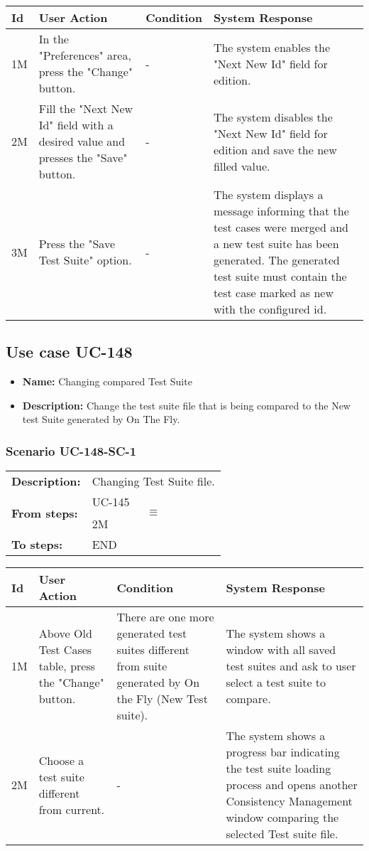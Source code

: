 \documentclass[a4paper,11pt]{article}
\newcommand{\bl}{\\ \hline}
\begin{document}
\begin{tabular}{|p{0.8in}|p{1.6in}|p{1.6in}|p{1.6in}|}
\hline
Id & User Action & Condition & System Response  \bl 
1M & In the "Preferences" area, press the "Change" button. & - & The system enables the "Next New Id" field for edition. \bl 
2M & Fill the "Next New Id" field with a desired value and presses the "Save" button. & - & The system disables the "Next New Id" field for edition and save the new filled value. \bl 
3M & Press the "Save Test Suite" option. & - & The system displays a message informing that the test cases were merged and a new test suite has been generated. The generated test suite must contain the test case marked as new with the configured id. \bl 
\end{tabular}
\subsection*{Use case UC-148}
\begin{itemize}
\item {\bf Name: }Changing compared Test Suite
\item {\bf Description: }Change the test suite file that is being compared to the New test Suite generated by On The Fly.
\end{itemize}
\subsubsection*{Scenario UC-148-SC-1}
\begin{tabular}{p{1in}p{4in}}
{\bf Description:} & Changing Test Suite file. \\
{\bf From steps:} & UC-145$$\equiv$$2M \\
{\bf To steps:} & END \\
\end{tabular}
 
\begin{tabular}{|p{0.8in}|p{1.6in}|p{1.6in}|p{1.6in}|}
\hline
Id & User Action & Condition & System Response  \bl 
1M & Above Old Test Cases table, press the "Change" button. & There are one more generated test suites different from suite generated by On the Fly (New Test suite). & The system shows a window with all saved test suites and ask to user select a test suite to compare. \bl 
2M & Choose a test suite different from current. & - & The system shows a progress bar indicating the test suite loading process and opens another Consistency Management window comparing the selected Test suite file. \bl 
\end{tabular}
\end{document}
